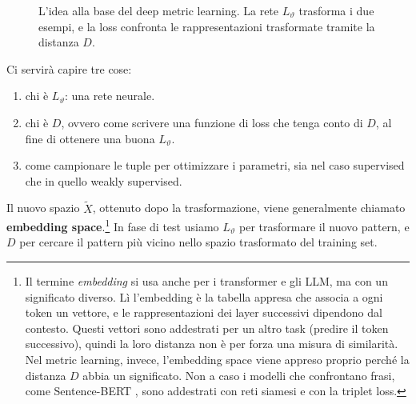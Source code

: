 \begin{figure}[htbp]
\centering
{}
\caption{L'idea alla base del deep metric learning. La rete $L_\vartheta$ trasforma i due esempi, e la loss confronta le rappresentazioni trasformate tramite la distanza $D$.}
\label{fig:dml-idea}
\end{figure}

Ci servirà capire tre cose:
\begin{enumerate}
    \item chi è $L_\vartheta$: una rete neurale.
    \item chi è $D$, ovvero come scrivere una funzione di loss che tenga conto di $D$, al fine di ottenere una buona $L_\vartheta$.
    \item come campionare le tuple per ottimizzare i parametri, sia nel caso supervised che in quello weakly supervised.
\end{enumerate}
Il nuovo spazio $\tilde{X}$, ottenuto dopo la trasformazione, viene generalmente chiamato \textbf{embedding space}.\footnote{Il termine \emph{embedding} si usa anche per i transformer e gli LLM, ma con un significato diverso. Lì l'embedding è la tabella appresa che associa a ogni token un vettore, e le rappresentazioni dei layer successivi dipendono dal contesto. Questi vettori sono addestrati per un altro task (predire il token successivo), quindi la loro distanza non è per forza una misura di similarità. Nel metric learning, invece, l'embedding space viene appreso proprio perché la distanza $D$ abbia un significato. Non a caso i modelli che confrontano frasi, come Sentence-BERT \cite{Reimers2019}, sono addestrati con reti siamesi e con la triplet loss.} In fase di test usiamo $L_\vartheta$ per trasformare il nuovo pattern, e $D$ per cercare il pattern più vicino nello spazio trasformato del training set.

